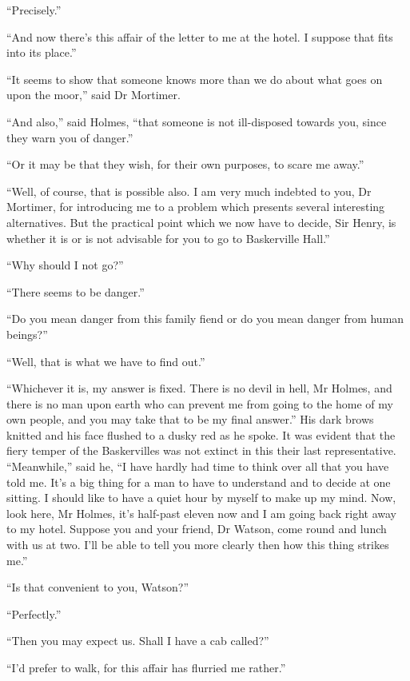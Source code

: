 \documentclass[paper=a5,BCOR=7mm,twoside,DIV=calc,12pt,usegeometry,openany,chapterprefix,endperiod,headings=big]{scrbook} %
\begin{document}
\enquote{Precisely.}

\enquote{And now there's this affair of the letter to me at the hotel. I suppose that fits into its place.}

\enquote{It seems to show that someone knows more than we do about what goes on upon the moor,} said Dr Mortimer.

\enquote{And also,} said Holmes, \enquote{that someone is not ill-disposed towards you, since they warn you of danger.}

\enquote{Or it may be that they wish, for their own purposes, to scare me away.}

\enquote{Well, of course, that is possible also. I am very much indebted to you, Dr Mortimer, for introducing me to a problem which presents several interesting alternatives. But the practical point which we now have to decide, Sir Henry, is whether it is or is not advisable for you to go to Baskerville Hall.}

\enquote{Why should I not go?}

\enquote{There seems to be danger.}

\enquote{Do you mean danger from this family fiend or do you mean danger from human beings?}

\enquote{Well, that is what we have to find out.}

\enquote{Whichever it is, my answer is fixed. There is no devil in hell, Mr Holmes, and there is no man upon earth who can prevent me from going to the home of my own people, and you may take that to be my final answer.} His dark brows knitted and his face flushed to a dusky red as he spoke. It was evident that the fiery temper of the Baskervilles was not extinct in this their last representative. \enquote{Meanwhile,} said he, \enquote{I have hardly had time to think over all that you have told me. It's a big thing for a man to have to understand and to decide at one sitting. I should like to have a quiet hour by myself to make up my mind. Now, look here, Mr Holmes, it's half-past eleven now and I am going back right away to my hotel. Suppose you and your friend, Dr Watson, come round and lunch with us at two. I'll be able to tell you more clearly then how this thing strikes me.}

\enquote{Is that convenient to you, Watson?}

\enquote{Perfectly.}

\enquote{Then you may expect us. Shall I have a cab called?}

\enquote{I'd prefer to walk, for this affair has flurried me rather.}
\end{document}
